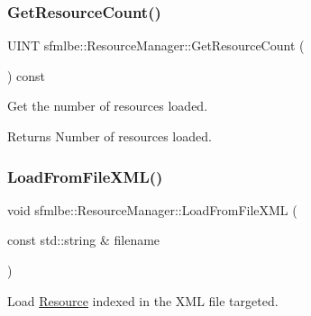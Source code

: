 \subsubsection{\texorpdfstring{Get\+Resource\+Count()}{GetResourceCount()}}
{\footnotesize\ttfamily U\+I\+NT sfmlbe\+::\+Resource\+Manager\+::\+Get\+Resource\+Count (\begin{DoxyParamCaption}{ }\end{DoxyParamCaption}) const\hspace{0.3cm}{\ttfamily [inline]}}



Get the number of resources loaded. 

\begin{DoxyReturn}{Returns}
Number of resources loaded. 
\end{DoxyReturn}
\mbox{\label{classsfmlbe_1_1_resource_manager_a8f99da24868d355227f641dc50db2bd2}} 
\subsubsection{\texorpdfstring{Load\+From\+File\+X\+M\+L()}{LoadFromFileXML()}\hspace{0.1cm}{\footnotesize\ttfamily [1/3]}}
{\footnotesize\ttfamily void sfmlbe\+::\+Resource\+Manager\+::\+Load\+From\+File\+X\+ML (\begin{DoxyParamCaption}\item[{const std\+::string \&}]{filename }\end{DoxyParamCaption})}



Load \mbox{\hyperlink{classsfmlbe_1_1_resource}{Resource}} indexed in the X\+ML file targeted. 

